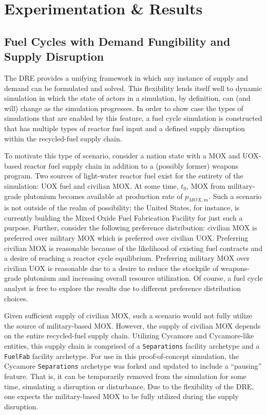 \section{Experimentation \& Results}\label{results}

\subsection{Fuel Cycles with Demand Fungibility and Supply Disruption}

The DRE provides a unifying framework in which any instance of supply and demand
can be formulated and solved. This flexibility lends itself well to dynamic
simulation in which the state of actors in a simulation, by definition, can (and
will) change as the simulation progresses. In order to show case the types of
simulations that are enabled by this feature, a fuel cycle simulation is
constructed that has multiple types of reactor fuel input and a defined supply
disruption within the recycled-fuel supply chain.

To motivate this type of scenario, consider a nation state with a MOX and
UOX-based reactor fuel supply chain in addition to a (possibly former) weapons
program. Two sources of light-water reactor fuel exist for the entirety of the
simulation: UOX fuel and civilian MOX. At some time, $t_0$, MOX from
military-grade plutonium becomes available at production rate of $p_{MOX,
  m}$. Such a scenario is not outside of the realm of possibility; the United
States, for instance, is currently building the Mixed Oxide Fuel Fabrication
Facility for just such a purpose. Further, consider the following preference
distribution: civilian MOX is preferred over military MOX which is preferred
over civilian UOX. Preferring civilian MOX is reasonable because of the
likelihood of existing fuel contracts and a desire of reaching a reactor cycle
equilibrium. Preferring military MOX over civilian UOX is reasonable due to a
desire to reduce the stockpile of weapons-grade plutonium and increasing overall
resource utilization. Of course, a fuel cycle analyst is free to explore the
results due to different preference distribution choices.

Given sufficient supply of civilian MOX, such a scenario would not fully utilize
the source of military-based MOX. However, the supply of civilian MOX depends on
the entire recycled-fuel supply chain. Utilizing Cycamore and Cycamore-like
entities, this supply chain is comprised of a \texttt{Separations} facility
archetype and a \texttt{FuelFab} facility archetype. For use in this
proof-of-concept simulation, the Cycamore \texttt{Separations} archetype was
forked and updated to include a ``pausing'' feature. That is, it can be
temporarily removed from the simulation for some time, simulating a disruption
or disturbance. Due to the flexibility of the DRE, one expects the
military-based MOX to be fully utilized during the supply disruption.

